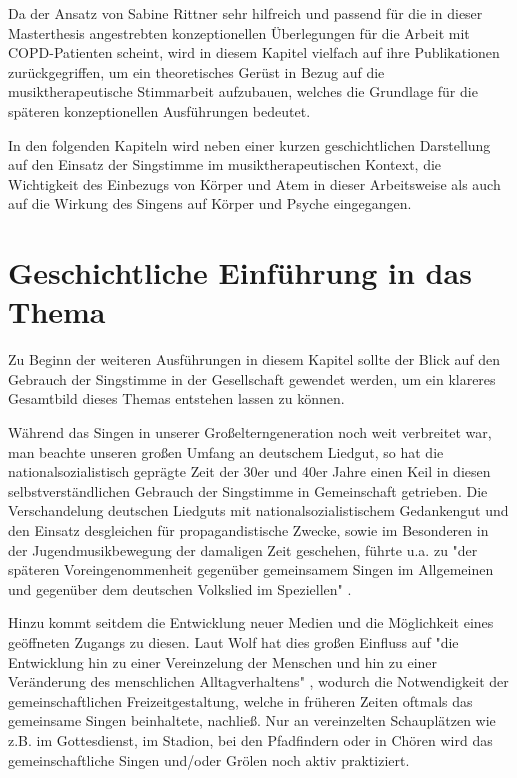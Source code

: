 Da der Ansatz von Sabine Rittner sehr hilfreich und passend für die in dieser Masterthesis angestrebten konzeptionellen Überlegungen für die Arbeit mit COPD-Patienten scheint, wird in diesem Kapitel vielfach auf ihre Publikationen zurückgegriffen, um ein theoretisches Gerüst in Bezug auf die musiktherapeutische Stimmarbeit aufzubauen, welches die Grundlage für die späteren konzeptionellen Ausführungen bedeutet.

In den folgenden Kapiteln wird neben einer kurzen geschichtlichen Darstellung auf den Einsatz der Singstimme im musiktherapeutischen Kontext, die Wichtigkeit des Einbezugs von Körper und Atem in dieser Arbeitsweise als auch auf die Wirkung des Singens auf Körper und Psyche eingegangen.

\section{Geschichtliche Einführung in das Thema}
Zu Beginn der weiteren Ausführungen in diesem Kapitel sollte der Blick auf den Gebrauch der Singstimme in der Gesellschaft gewendet werden, um ein klareres Gesamtbild dieses Themas entstehen lassen zu können.

Während das Singen in unserer Großelterngeneration noch weit verbreitet war, man beachte unseren großen Umfang an deutschem Liedgut, so hat die nationalsozialistisch geprägte Zeit der 30er und 40er Jahre einen Keil in diesen selbstverständlichen Gebrauch der Singstimme in Gemeinschaft getrieben.
Die Verschandelung deutschen Liedguts mit nationalsozialistischem Gedankengut und den Einsatz desgleichen für propagandistische Zwecke, sowie im Besonderen in der Jugendmusikbewegung der damaligen Zeit geschehen, führte u.a. zu "der späteren Voreingenommenheit gegenüber gemeinsamem Singen im Allgemeinen und gegenüber dem deutschen Volkslied im Speziellen" \autocite[9]{wolf2012}.

Hinzu kommt seitdem die Entwicklung neuer Medien und die Möglichkeit eines geöffneten Zugangs zu diesen. Laut Wolf hat dies großen Einfluss auf "die Entwicklung hin zu einer Vereinzelung der Menschen und hin zu einer Veränderung des menschlichen Alltagverhaltens" \autocite[10]{wolf2012}, wodurch die Notwendigkeit der gemeinschaftlichen Freizeitgestaltung, welche in früheren Zeiten oftmals das gemeinsame Singen beinhaltete, nachließ. Nur an vereinzelten Schauplätzen wie z.B. im Gottesdienst, im Stadion, bei den Pfadfindern oder in Chören wird das gemeinschaftliche Singen und/oder Grölen noch aktiv praktiziert.

